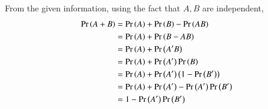 From the given information, using the fact that $A,B$ are independent,
\begin{align}
\pr{A+B} &= \pr{A}+\pr{B}-\pr{AB}
\\
&= \pr{A} + \pr{B-AB} 
\\
&= \pr{A} + \pr{A'B}
\\
&= \pr{A} + \pr{A'}\pr{B}
\\
&= \pr{A} + \pr{A'}\brak{1-\pr{B'}}
\\
&= \pr{A} + \pr{A'}-\pr{A'}\pr{B'}
\\
&=1 - \pr{A'}\pr{B'}
\end{align}

